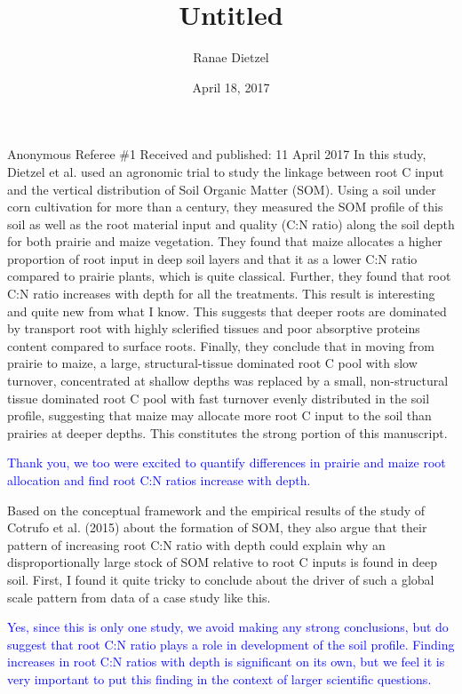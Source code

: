 \documentclass[]{article}
\title{Untitled}
\author{Ranae Dietzel}
\date{April 18, 2017}
\begin{document}
\maketitle

Anonymous Referee \#1 Received and published: 11 April 2017 In this
study, Dietzel et al. used an agronomic trial to study the linkage
between root C input and the vertical distribution of Soil Organic
Matter (SOM). Using a soil under corn cultivation for more than a
century, they measured the SOM profile of this soil as well as the root
material input and quality (C:N ratio) along the soil depth for both
prairie and maize vegetation. They found that maize allocates a higher
proportion of root input in deep soil layers and that it as a lower C:N
ratio compared to prairie plants, which is quite classical. Further,
they found that root C:N ratio increases with depth for all the
treatments. This result is interesting and quite new from what I know.
This suggests that deeper roots are dominated by transport root with
highly sclerified tissues and poor absorptive proteins content compared
to surface roots. Finally, they conclude that in moving from prairie to
maize, a large, structural-tissue dominated root C pool with slow
turnover, concentrated at shallow depths was replaced by a small,
non-structural tissue dominated root C pool with fast turnover evenly
distributed in the soil profile, suggesting that maize may allocate more
root C input to the soil than prairies at deeper depths. This
constitutes the strong portion of this manuscript.

\textcolor{blue}{Thank you, we too were excited to quantify differences in prairie and maize root allocation and find root C:N ratios increase with depth.}

Based on the conceptual framework and the empirical results of the study
of Cotrufo et al. (2015) about the formation of SOM, they also argue
that their pattern of increasing root C:N ratio with depth could explain
why an disproportionally large stock of SOM relative to root C inputs is
found in deep soil. First, I found it quite tricky to conclude about the
driver of such a global scale pattern from data of a case study like
this.

\textcolor{blue}{Yes, since this is only one study, we avoid making any strong conclusions, but do suggest that root C:N ratio plays a role in development of the soil profile. Finding increases in root C:N ratios with depth is significant on its own, but we feel it is very important to put this finding in the context of larger scientific questions.}
\end{document}
